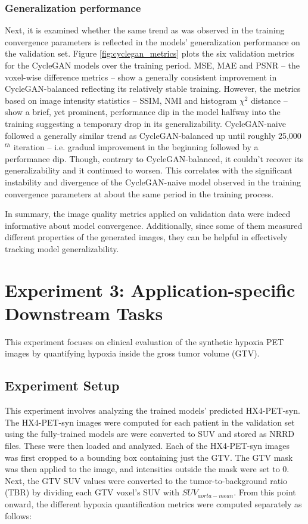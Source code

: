 \subsubsection{Generalization performance} 
Next, it is examined whether the same trend as was observed in the training convergence parameters is reflected in the models' generalization performance on the validation set. Figure \ref{fig:cyclegan_metrics} plots the six validation metrics for the CycleGAN models over the training period. MSE, MAE and PSNR -- the voxel-wise difference metrics -- show a generally consistent improvement in CycleGAN-balanced reflecting its relatively stable training. However, the metrics based on image intensity statistics -- SSIM, NMI and histogram $\chi^2$ distance -- show a brief, yet prominent, performance dip in the model halfway into the training suggesting a temporary drop in its generalizability. CycleGAN-naive followed a generally similar trend as CycleGAN-balanced up until roughly 25,000$^{th}$ iteration -- i.e. gradual improvement in the beginning followed by a performance dip. Though, contrary to CycleGAN-balanced, it couldn't recover its generalizability and it continued to worsen. This correlates with the significant instability and divergence of the CycleGAN-naive model observed in the training convergence parameters at about the same period in the training process.

In summary, the image quality metrics applied on validation data were indeed informative about model convergence. Additionally, since some of them measured different properties of the generated images, they can be helpful in effectively tracking model generalizability.



\section{Experiment 3: Application-specific Downstream Tasks}
\label{Expt_3}
This experiment focuses on clinical evaluation of the synthetic hypoxia PET images by quantifying hypoxia inside the gross tumor volume (GTV).


\subsection{Experiment Setup}
This experiment involves analyzing the trained models' predicted HX4-PET-syn. The HX4-PET-syn images were computed for each patient in the validation set using the fully-trained models are were converted to SUV and stored as NRRD files. These were then loaded and analyzed. Each of the HX4-PET-syn images was first cropped to a bounding box containing just the GTV. The GTV mask was then applied to the image, and intensities outside the mask were set to 0. Next, the GTV SUV values were converted to the tumor-to-background ratio (TBR) by dividing each GTV voxel's SUV with $SUV_{aorta-mean}$. From this point onward, the different hypoxia quantification metrics were computed separately as follows:

